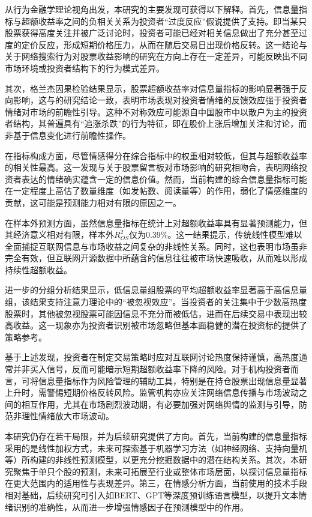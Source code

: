 \documentclass[12pt, a4paper]{article}
\begin{document}
从行为金融学理论视角出发，本研究的主要发现可获得以下解释。首先，信息量指标与超额收益率之间的负相关关系为投资者“过度反应”假说提供了支持。即当某只股票获得高度关注并被广泛讨论时，投资者可能已经对相关信息做出了充分甚至过度的定价反应，形成短期价格压力，从而在随后交易日出现价格反转。这一结论与\citet{zhang2014internet}关于网络搜索行为对股票收益影响的研究在方向上存在一定差异，可能反映出不同市场环境或投资者结构下的行为模式差异。

其次，格兰杰因果检验结果显示，股票超额收益率对信息量指标的影响显著强于反向影响，这与\citet{cheng2013investor}的研究结论一致，表明市场表现对投资者情绪的反馈效应强于投资者情绪对市场的前瞻性引导。这种不对称效应可能源自中国股市中以散户为主的投资者结构，其普遍具有“追涨杀跌”的行为特征，即在股价上涨后增加关注和讨论，而非基于信息变化进行前瞻性操作。

在指标构成方面，尽管情感得分在综合指标中的权重相对较低，但其与超额收益率的相关性最高。这一发现与\citet{antweiler2004information}关于股票留言板对市场影响的研究相吻合，表明网络投资者表达的情绪确实蕴含一定的信息价值。然而，当前构建的综合信息量指标可能在一定程度上高估了数量维度（如发帖数、阅读量等）的作用，弱化了情感维度的贡献，这可能是预测能力相对有限的原因之一。

在样本外预测方面，虽然信息量指标在统计上对超额收益率具有显著预测能力，但其经济意义相对有限，样本外$R^2_{OS}$仅为0.39\%。这一结果提示，传统线性模型难以全面捕捉互联网信息与市场收益之间复杂的非线性关系。同时，这也表明市场虽非完全有效，但互联网开源数据中所蕴含的信息往往被市场快速吸收，从而难以形成持续性超额收益。

进一步的分组分析结果显示，低信息量组股票的平均超额收益率显著高于高信息量组，该结果支持注意力理论中的“被忽视效应”。当投资者的关注集中于少数高热度股票时，其他被忽视股票可能因信息不充分而被低估，进而在后续交易中表现出较高收益。这一现象亦为投资者识别被市场忽略但基本面稳健的潜在投资标的提供了策略参考。

基于上述发现，投资者在制定交易策略时应对互联网讨论热度保持谨慎，高热度通常并非买入信号，反而可能暗示短期超额收益率下降的风险。对于机构投资者而言，可将信息量指标作为风险管理的辅助工具，特别是在持仓股票出现信息量显著上升时，需警惕短期价格反转风险。监管机构亦应关注网络信息传播与市场波动之间的相互作用，尤其在市场剧烈波动期，有必要加强对网络舆情的监测与引导，防范非理性情绪放大市场波动。

本研究仍存在若干局限，并为后续研究提供了方向。首先，当前构建的信息量指标采用的是线性加权方式，未来可探索基于机器学习方法（如神经网络、支持向量机等）所构建的非线性预测模型，以更充分挖掘数据中的潜在结构关系。其次，本研究聚焦于单只个股的预测，未来可拓展至行业或整体市场层面，以探讨信息量指标在更大范围内的适用性与表现差异。第三，在情感分析方面，当前使用的技术手段相对基础，后续研究可引入如BERT、GPT等深度预训练语言模型，以提升文本情绪识别的准确性，从而进一步增强情感因子在预测模型中的作用。
\end{document}
